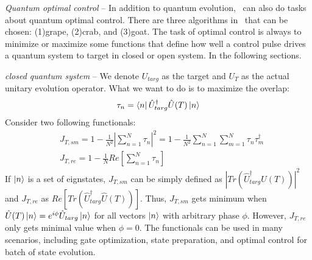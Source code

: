 \textit{Quantum optimal control} -- In addition to quantum evolution, \MindQuantum\ can also do tasks about quantum optimal control. There are three algorithms in \MindQuantum\ that can be chosen: (1)grape, (2)crab, and (3)goat. The task of optimal control is always to minimize or maximize some functions that define how well a control pulse drives a quantum system to target in closed or open system. In the following sections.

\textit{closed quantum system} -- We denote $U_{targ}$ as the target and $U_{T}$ as the actual unitary evolution operator. What we want to do is to maximize the overlap:
\begin{equation}
    \tau_{n}=\bra{n}\hat{U}_{targ}^{\dagger}\hat{U}(T)\ket{n}
\end{equation}
Consider two following functionals:
\begin{equation}
    \begin{split}
        &J_{T,sm}=1-\frac{1}{N^{2}}\left|\sum_{n=1}^{N}\tau_{n}\right|^{2}=1-\frac{1}{N^{2}}\sum_{n=1}^{N}\sum_{m=1}^{N}\tau_{n}\tau_{m}^{\dagger}\\
        &J_{T,re}=1-\frac{1}{N}Re\left[\sum_{n=1}^{N}\tau_{n}\right]
    \end{split}
    \label{close}
\end{equation}
If ${\ket{n}}$ is a  set of eignstates, $J_{T,sm}$ can be simply defined as $\left|Tr(\hat{U}_{targ}^{\dagger}\hat{U}(T))\right|^{2}$ and $J_{T,re}$ as $Re[Tr(\hat{U}^{\dagger}_{targ}\hat{U}(T))]$. Thus, $J_{T,sm}$ gets minimum when $\hat{U}(T)\ket{n}=e^{i\phi}\hat{U}_{targ}\ket{n}$ for all vectors $\ket{n}$ with arbitrary phase $\phi$. However, $J_{T,re}$ only gets minimal value when $\phi=0$. The functionals can be used in many scenarios, including gate optimization, state preparation, and optimal control for batch of state evolution.

